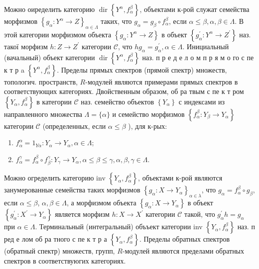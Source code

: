 \documentclass[10pt]{article}
\begin{document}
Можно оиределить категорию $\operatorname{dir}\left\{Y^{\alpha}, f_{\alpha}^{\beta}\right\}$, объектами к-рой служат семейства морфизмов $\left\{g_{\alpha}: Y^{\alpha} \rightarrow Z\right\}_{\alpha \in \Lambda}$ таких, что $g_{\alpha}=g_{\beta} \circ f_{\alpha}^{\beta}$, если $\alpha \leqslant \beta, \alpha, \beta \in \Lambda$. В этой категории морфизмом объекта $\left\{g_{\alpha}: Y^{\alpha} \rightarrow Z\right\}$ в объект $\left\{g_{\alpha}^{\prime}: Y^{\alpha} \rightarrow Z^{\prime}\right\}$ наз. такої морфизм $h: Z \rightarrow Z^{\prime}$ категории $\mathscr{C}$, что $h g_{\alpha}=g_{\alpha}^{\prime}, \alpha \in \Lambda$. Инициальный (вачальный) объект категории $\operatorname{dir}\left\{Y^{\alpha}, f_{\alpha}^{\beta}\right\}$ наз. п р е д е л о м п р я м о го с пе к т р a $\left\{Y^{\alpha}, f_{\alpha}^{\beta}\right\}$. Пределы прямых спектров (прямой спектр) множеств, топологич. пространств, $R$-модулей являются примерами прямых спектров в соответствующих категориях. Двойственным образом, об ра твым с пе к т ром $\left\{Y_{\alpha}, f_{\alpha}^{\beta}\right\}$ в категории $\mathscr{C}$ наз. семейство объектов $\left\{Y_{\alpha}\right\}$ с индексами из направленного множества $\Lambda=\{\alpha\}$ и семейство морфизмов $\left\{f_{\alpha}^{\beta}: Y_{\beta} \rightarrow Y_{\alpha}\right\}$ категории $\mathscr{C}$ (определенных, если $\alpha \leqslant \beta$ ), для к-рых:



\begin{enumerate}

  \item $f_{\alpha}^{\alpha}=1_{Y \alpha}: Y_{\alpha} \rightarrow Y_{\alpha}, \alpha \in \Lambda$;



  \item $f_{\alpha}^{\gamma}=f_{\alpha}^{\beta} \circ f_{\beta}^{\gamma}: Y_{\gamma} \rightarrow Y_{\alpha}, \alpha \leqslant \beta \leqslant \gamma, \alpha, \beta, \gamma \in \Lambda$.



\end{enumerate}



Можно огределить категорию inv $\left\{Y_{\alpha}, f_{\alpha}^{\beta}\right\}$, объектами к-рой являются занумерованные семейства таких морфизмов $\left\{g_{\alpha}: X \rightarrow Y_{\alpha}\right\}_{\alpha \in \lambda}$, что $g_{\alpha}=f_{\alpha}^{\beta} \circ g_{\beta}$, если $\alpha \leqslant \beta$, $\alpha, \beta \in \Lambda$, а морфизмом объекта $\left\{g_{\alpha}: X \rightarrow Y_{\alpha}\right\}$ в объект $\left\{g_{\alpha}^{\prime}: X^{\prime} \rightarrow Y_{\alpha}\right\}$ является морфизм $h: X \rightarrow X^{\prime}$ категории $\mathscr{C}$ такой, что $g_{\alpha}^{\prime} h=g_{\alpha}$ при $\alpha \in \Lambda$. Терминальный (интегральный) объъект категории inv $\left\{Y_{\alpha}, f_{\alpha}^{\beta}\right\}$ наз. п ред е лом об ра тного с пе к т р а $\left\{Y_{\alpha}, f_{\alpha}^{\beta}\right\}$. Пределы обратных спектров (обратный спектр) множеств, групп, $R$-модулей являются пределами обратных спектров в соответствуюгих категориях.
\end{document}
